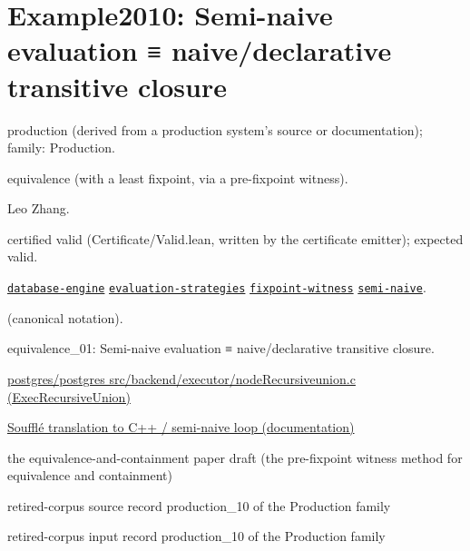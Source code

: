\documentclass[10pt]{article}
\begin{document}
\Needspace{0.45\textheight}

\section{Example2010: Semi-naive evaluation ≡ naive/declarative transitive closure}\label{case:Example2010}

\begin{description}[leftmargin=2.6cm,style=nextline,itemsep=1pt]

\item[Category] production (derived from a production system's source or documentation); family: Production.

\item[Kind] equivalence (with a least fixpoint, via a pre-fixpoint witness).

\item[Contributors] Leo Zhang.

\item[Status] certified valid (Certificate/Valid.lean, written by the certificate emitter); expected valid.

\item[Tags] \hyperref[tag:database-engine]{\texttt{database-engine}} \hyperref[tag:evaluation-strategies]{\texttt{evaluation-strategies}} \hyperref[tag:fixpoint-witness]{\texttt{fixpoint-witness}} \hyperref[tag:semi-naive]{\texttt{semi-naive}}.

\item[Input]  (canonical notation).

\item[Summary] equivalence\_01: Semi-naive evaluation ≡ naive/declarative transitive closure.

\item[Sources] {\raggedright \href{https://github.com/postgres/postgres/blob/master/src/backend/executor/nodeRecursiveunion.c}{postgres/postgres src/backend/executor/nodeRecursiveunion.c (ExecRecursiveUnion)} \par \href{https://souffle-lang.github.io/translate}{Soufflé translation to C++ / semi-naive loop (documentation)} \par the equivalence-and-containment paper draft (the pre-fixpoint witness method for equivalence and containment) \par retired-corpus source record production\_10 of the Production family \par retired-corpus input record production\_10 of the Production family\par}

\end{description}
\end{document}
